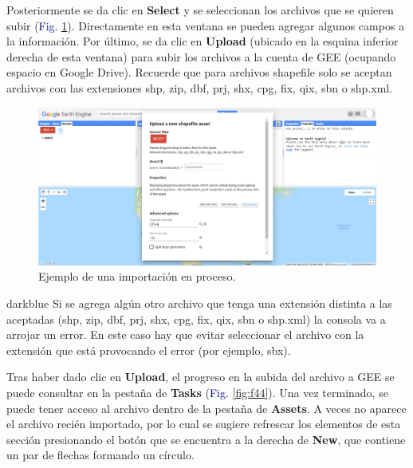 \documentclass[
  12pt,
  letterpaper,
  twoside]{book}
\begin{document}
Posteriormente se da clic en \textbf{Select} y se seleccionan los archivos que se quieren subir (\textcolor{darkblue}{Fig.} \ref{fig:f43}). Directamente en esta ventana se pueden agregar algunos campos a la información. Por último, se da clic en \textbf{Upload} (ubicado en la esquina inferior derecha de esta ventana) para subir los archivos a la cuenta de GEE (ocupando espacio en Google Drive). Recuerde que para archivos shapefile solo se aceptan archivos con las extensiones shp, zip, dbf, prj, shx, cpg, fix, qix, sbn o shp.xml.

\begin{figure}[H]

{\centering \includegraphics[width=0.95\linewidth]{Img/Asset2} 

}

\caption{Ejemplo de una importación en proceso.}\label{fig:f43}
\end{figure}

\begin{bluebox2}

\begin{awesomeblock}{5pt}{\faLightbulb}{darkblue}
Si se agrega algún otro archivo que tenga una extensión distinta a las aceptadas (shp, zip, dbf, prj, shx, cpg, fix, qix, sbn o shp.xml) la consola va a arrojar un error. En este caso hay que evitar seleccionar el archivo con la extensión que está provocando el error (por ejemplo, sbx).

\end{awesomeblock}

\end{bluebox2}

Tras haber dado clic en \textbf{Upload}, el progreso en la subida del archivo a GEE se puede consultar en la pestaña de \textbf{Tasks} (\textcolor{darkblue}{Fig.} \ref{fig:f44}). Una vez terminado, se puede tener acceso al archivo dentro de la pestaña de \textbf{Assets}. A veces no aparece el archivo recién importado, por lo cual se sugiere refrescar los elementos de esta sección presionando el botón que se encuentra a la derecha de \textbf{New}, que contiene un par de flechas formando un círculo.
\end{document}

